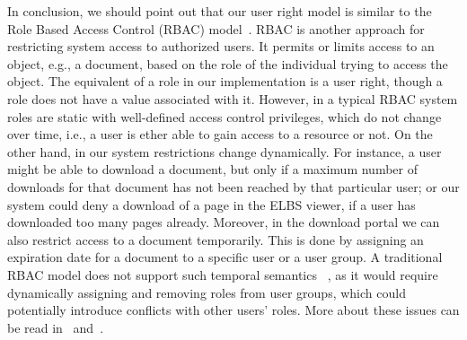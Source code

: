 In conclusion, we should point out that our user right model is similar to 
the Role Based Access Control (RBAC) model~\cite{prbac}. 
RBAC is another approach for restricting system access to authorized users.
It permits or limits access to an object, e.g., a document, 
based on the role of the individual trying to access the object. 
The equivalent of a role in our implementation is a user right, though a role does not have
a value associated with it. 
However, in a typical RBAC system roles are static with well-defined access
control privileges, which do not change over time, i.e.,
a user is ether able to gain access to a resource or not. 
On the other hand, in our system restrictions change dynamically. For instance, a user 
might be able to download a document, but only if a maximum number of downloads for that document has not been 
reached by that particular user; or our system could deny a download of a page in the ELBS viewer, if a user
has downloaded too many pages already. Moreover, in the download portal we can
also restrict access to a document temporarily. This is done by assigning an
expiration date for a document to a specific user or a user group. 
A traditional RBAC model does not support such temporal semantics 
~\cite{prbac2}, as it would require dynamically assigning and removing roles from user groups, which
could potentially introduce conflicts with other users' roles. More about these issues can be read in~\cite{prbac2} and~\cite{prbac3}.


